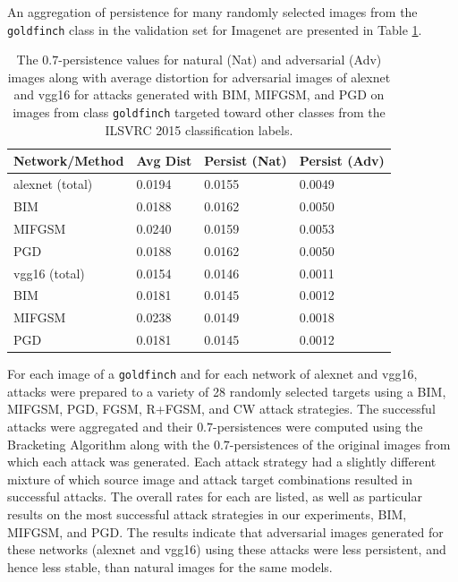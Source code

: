 An aggregation of persistence for many randomly selected images from the \texttt{goldfinch} class in the validation set for Imagenet are presented in Table \ref{TAB:PersistenceAlexVGG}. 
\begin{table}[!ht]
\centering


\begin{tabular}{llll}
\toprule
Network/Method & Avg Dist & Persist (Nat) & Persist (Adv) \\
\midrule
alexnet (total) & 0.0194 & 0.0155 & 0.0049 \\ 
\:\: BIM        & 0.0188 & 0.0162 & 0.0050 \\ 
\:\: MIFGSM     & 0.0240 & 0.0159 & 0.0053 \\ 
\:\: PGD        & 0.0188 & 0.0162 & 0.0050 \\ 
\midrule
vgg16   (total) & 0.0154 & 0.0146 & 0.0011 \\ 
\:\: BIM        & 0.0181 & 0.0145 & 0.0012 \\ 
\:\: MIFGSM     & 0.0238 & 0.0149 & 0.0018 \\ 
\:\: PGD        & 0.0181 & 0.0145 & 0.0012 \\ 
\bottomrule
\end{tabular}
\caption{The $0.7$-persistence values for natural (Nat) and
  adversarial (Adv) images along with average distortion for
  adversarial images of alexnet and vgg16 for attacks generated with
  BIM, MIFGSM, and PGD on images from class \texttt{goldfinch}
  targeted toward other classes from the ILSVRC 2015 classification
  labels.} \label{TAB:PersistenceAlexVGG}%
\end{table}
For each image of a \texttt{goldfinch} and for each network of alexnet and vgg16, attacks were prepared to a variety of 28 randomly selected targets using a BIM, MIFGSM, PGD, FGSM, R+FGSM, and CW attack strategies. The successful attacks were aggregated and their $0.7$-persistences were computed using the Bracketing Algorithm along with the $0.7$-persistences of the original images from which each attack was generated. Each attack strategy had a slightly different mixture of which source image and attack target combinations resulted in successful attacks. The overall rates for each are listed, as well as particular results on the most successful attack strategies in our experiments, BIM, MIFGSM, and PGD. The results indicate that adversarial images generated for these networks (alexnet and vgg16) using these attacks were less persistent, and hence less stable, than natural images for the same models. 



